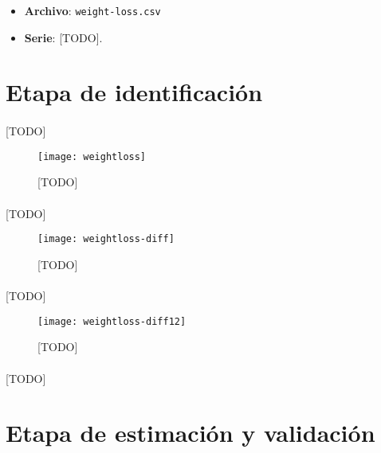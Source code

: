 \documentclass[a4paper, spanish]{article}
\begin{document}
  \maketitle

  \begin{itemize}
    \item \textbf{Archivo}: \texttt{weight-loss.csv}
    \item \textbf{Serie}: [TODO].
  \end{itemize}

  \section{Etapa de identificación}

    \paragraph{}
    [TODO]

    \begin{figure}
      \texttt{[image: weightloss]}
      \caption{[TODO]}
      \label{}
    \end{figure}

    \paragraph{}
    [TODO]

    \begin{figure}
      \texttt{[image: weightloss-diff]}
      \caption{[TODO]}
      \label{}
    \end{figure}

    \paragraph{}
    [TODO]

    \begin{figure}
      \texttt{[image: weightloss-diff12]}
      \caption{[TODO]}
      \label{}
    \end{figure}

    \paragraph{}
    [TODO]

  \section{Etapa de estimación y validación}
\end{document}
